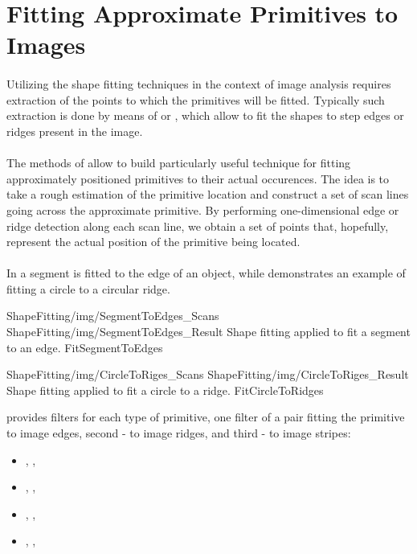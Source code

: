 \section{Fitting Approximate Primitives to Images}

\paragraph*{}
Utilizing the shape fitting techniques in the context of image analysis requires extraction of the points to which the primitives will be fitted. Typically such extraction is done by means of  or , which allow to fit the shapes to step edges or ridges present in the image.

\paragraph*{}
The methods of  allow to build particularly useful technique for fitting approximately positioned primitives to their actual occurences. The idea is to take a rough estimation of the primitive location and construct a set of scan lines going across the approximate primitive. By performing one-dimensional edge or ridge detection along each scan line, we obtain a set of points that, hopefully, represent the actual position of the primitive being located.

\paragraph*{}
In  a segment is fitted to the edge of an object, while  demonstrates an example of fitting a circle to a circular ridge.

\twoFigures
{ShapeFitting/img/SegmentToEdges_Scans}
{ShapeFitting/img/SegmentToEdges_Result}
{Shape fitting applied to fit a segment to an edge.}
{FitSegmentToEdges}
{\basicWidth}

\twoFigures
{ShapeFitting/img/CircleToRiges_Scans}
{ShapeFitting/img/CircleToRiges_Result}
{Shape fitting applied to fit a circle to a ridge.}
{FitCircleToRidges}
{\basicWidth}

\begin{refImpl}
\studio provides filters for each type of primitive, one filter of a pair fitting the primitive to image edges, second - to image ridges, and third - to image stripes:
\begin{itemize}
	\item {}, , 
	\item {}, , 
	\item {}, , 
	\item {}, , 
\end{itemize}
\end{refImpl}